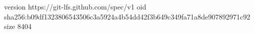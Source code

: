 version https://git-lfs.github.com/spec/v1
oid sha256:b09df1323806543506c3a5924a4b54dd42f3b649c349fa71a8de907892971c92
size 8404
